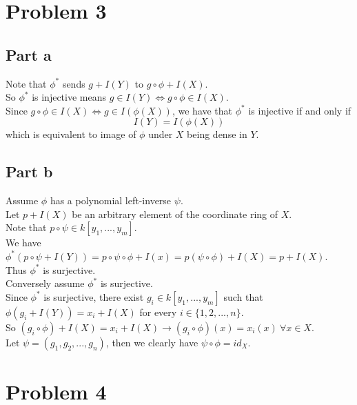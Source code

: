 \documentclass[12pt]{article}
\begin{document}
\clearpage
\section*{Problem 3}
\subsection*{Part a}
Note that $\phi^*$ sends $g+I(Y)$ to $g \circ \phi
+I(X)$.\\ 
So $\phi^*$ is injective means
$g \in I(Y) \Longleftrightarrow g \circ \phi \in I(X)$. \\
Since $g \circ \phi \in I(X) \Longleftrightarrow
g \in I(\phi(X))$, we have that
$\phi^{*}$ is injective if and only if
$$I(Y)=I(\phi(X))$$
which is equivalent to image of $\phi$ under $X$ being dense in $Y$.
\subsection*{Part b}
Assume $\phi$ has a polynomial left-inverse $\psi$. \\
Let $p+I(X)$ be an arbitrary element of the coordinate ring of $X$. \\
Note that $p \circ \psi \in k[y_1,...,y_m]$. \\
We have $\phi^* (p \circ \psi +I(Y)) =
p \circ \psi \circ \phi +I(x) =
p(\psi \circ \phi) +I(X) =p+I(X)$.\\ 
Thus $\phi^*$ is surjective. \\
Conversely assume $\phi^*$ is surjective. \\
Since $\phi^*$ is surjective, there exist $g_i \in k[y_1,...,y_m]$ such that 
$\phi (g_i + I(Y)) = x_i + I(X)$ for every $i \in \{1,2,...,n\}$. \\
So $(g_i \circ \phi) +I(X)=x_i +I(X) \rightarrow (g_i \circ \phi)(x)=x_i(x) \ \forall x \in X$.\\
Let $\psi = (g_1,g_2,...,g_n)$, then we clearly have
$\psi \circ \phi = id_{X}$.


\section*{Problem 4}
\end{document}
